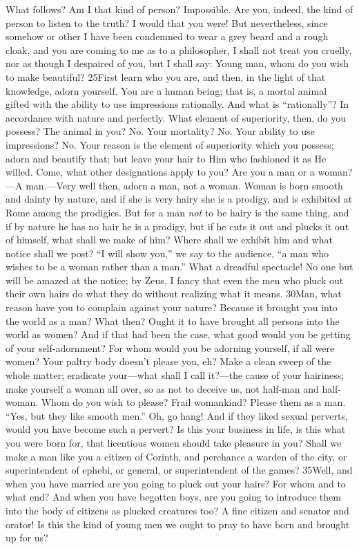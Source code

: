 What follows? Am I that kind of person? Impossible. Are you, indeed, the kind of person to listen to the truth? I would that you were! But nevertheless, since somehow or other I have been condemned to wear a grey beard and a rough cloak, and you are coming to me as to a philosopher, I shall not treat you cruelly, nor as though I despaired of you, but I shall say: Young man, whom do you wish to make beautiful? 25First learn who you are, and then, in the light of that knowledge, adorn yourself. You are a human being; that is, a mortal animal gifted with the ability to use impressions rationally. And what is ``rationally''? In accordance with nature and perfectly. What element of superiority, then, do you possess? The animal in you? No. Your mortality? No. Your ability to use impressions? No. Your reason is the element of superiority which you possess; adorn and beautify that; but leave your hair to Him who fashioned it as He willed. Come, what other designations apply to you? Are you a man or a woman?—A man.—Very well then, adorn a man, not a woman. Woman is born smooth and dainty by nature, and if she is very hairy she is a prodigy, and is exhibited at Rome among the prodigies. But for a man \emph{not} to be hairy is the same thing, and if by nature he has no hair he is a prodigy, but if he cuts it out and plucks it out of himself, what shall we make of him? Where shall we exhibit him and what notice shall we post? ``I will show you,'' we say to the audience, ``a man who wishes to be a woman rather than a man.'' What a dreadful spectacle! No one but will be amazed at the notice; by Zeus, I fancy that even the men who pluck out their own hairs do what they do without realizing what it means. 30Man, what reason have you to complain against your nature? Because it brought you into the world as a man? What then? Ought it to have brought all persons into the world as women? And if that had been the case, what good would you be getting of your self-adornment? For whom would you be adorning yourself, if all were women? Your paltry body doesn't please you, eh? Make a clean sweep of the whole matter; eradicate your—what shall I call it?—the cause of your hairiness; make yourself a woman all over, so as not to deceive us, not half-man and half-woman. Whom do you wish to please? Frail womankind? Please them as a man. ``Yes, but they like smooth men.'' Oh, go hang! And if they liked sexual perverts, would you have become such a pervert? Is this your business in life, is this what you were born for, that licentious women should take pleasure in you? Shall we make a man like you a citizen of Corinth, and perchance a warden of the city, or superintendent of ephebi, or general, or superintendent of the games? 35Well, and when you have married are you going to pluck out your hairs? For whom and to what end? And when you have begotten boys, are you going to introduce them into the body of citizens as plucked creatures too? A fine citizen and senator and orator! Is this the kind of young men we ought to pray to have born and brought up for us?

